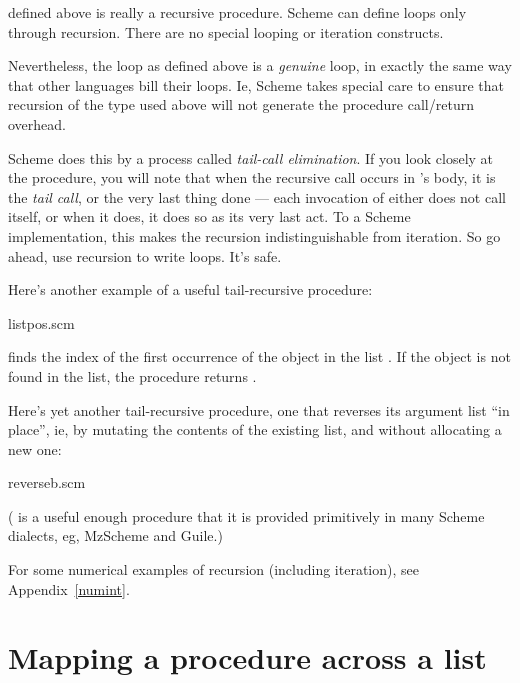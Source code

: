  defined above is really a recursive
procedure.  Scheme can define loops only through
recursion.  There are no special looping or iteration
constructs.

Nevertheless, the loop as defined above is a {\em
genuine} loop, in exactly the same way that other
languages bill their loops.  Ie, Scheme takes special
care to ensure that recursion of the type used above
will not generate the procedure call/return overhead.

Scheme does this by a process called {\em tail-call
elimination}.  If you look closely at the 
procedure, you will note that when the recursive call
occurs in 's body, it is the {\em tail call},
or the very last thing done --- each invocation of
 either does not call itself, or when it
does, it does so as its very last act.  To a Scheme
implementation, this makes the recursion
indistinguishable from iteration.  So go ahead, use
recursion to write loops.  It's safe.

Here's another example of a useful tail-recursive
procedure:

\scmfilename listpos.scm

\n {} finds the index of the first
occurrence of the object  in the list .  If
the object is not found in the list, the procedure
returns .

Here's yet another tail-recursive procedure, one that
reverses its argument list ``in place'', ie, by mutating
the contents of the existing list, and without
allocating a new one: 

\scmfilename reverseb.scm

\n 
( is a useful enough procedure that it is
provided primitively in many Scheme dialects, eg,
MzScheme and Guile.) 

For some numerical examples of recursion (including iteration),
see Appendix~\ref{numint}.


\section{Mapping a procedure across a list}

